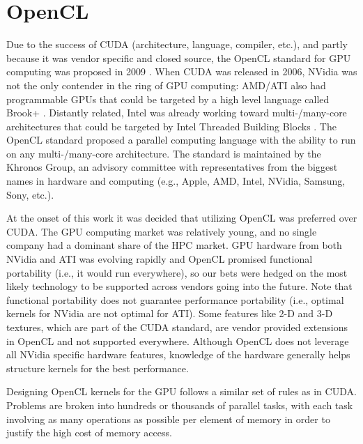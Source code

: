 \documentclass{report}
\begin{document}
\section{OpenCL}

Due to the success of CUDA (architecture, language, compiler, etc.), and partly because it was vendor specific and closed source, the OpenCL standard for GPU computing was proposed in 2009 \cite{OpenCL2009}. When CUDA was released in 2006, NVidia was not the only contender in the ring of GPU computing: AMD/ATI also had programmable GPUs that could be targeted by a high level language called Brook+ \cite{BrookGPU2004}. Distantly related, Intel was already working toward multi-/many-core architectures that could be targeted by Intel Threaded Building Blocks \cite{IntelTBB}. The OpenCL standard proposed a parallel computing language with the ability to run on any multi-/many-core architecture. The standard is maintained by the Khronos Group, an advisory committee with representatives from the biggest names in hardware and computing (e.g., Apple, AMD, Intel, NVidia, Samsung, Sony, etc.). 

At the onset of this work it was decided that utilizing OpenCL was preferred over CUDA. The GPU computing market was relatively young, and no single company had a dominant share of the HPC market. GPU hardware from both NVidia and ATI was evolving rapidly and OpenCL promised functional portability (i.e., it would run everywhere), so our bets were hedged on the most likely technology to be supported across vendors going into the future. Note that functional portability does not guarantee performance portability (i.e., optimal kernels for NVidia are not optimal for ATI). Some features like 2-D and 3-D textures, which are part of the CUDA standard, are vendor provided extensions in OpenCL and not supported everywhere. Although OpenCL does not leverage all NVidia specific hardware features, knowledge of the hardware generally helps
structure kernels for the best performance. 



Designing OpenCL kernels for the GPU follows a similar set of rules as in CUDA. Problems are broken into hundreds or thousands of parallel tasks, with each task involving as many operations as possible per element of memory in order to justify the high cost of memory access.
\end{document}
